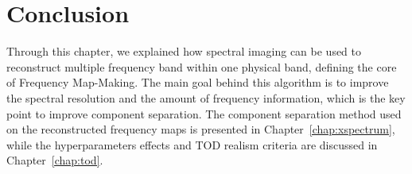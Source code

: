 \documentclass[../../thesis.tex]{subfiles}
\begin{document}
\section*{Conclusion}

Through this chapter, we explained how spectral imaging can be used to reconstruct multiple frequency band within one physical band, defining the core of Frequency Map-Making. The main goal behind this algorithm is to improve the spectral resolution and the amount of frequency information, which is the key point to improve component separation. The component separation method used on the reconstructed frequency maps is presented in Chapter~\ref{chap:xspectrum}, while the hyperparameters effects and TOD realism criteria are discussed in Chapter~\ref{chap:tod}.
\end{document}
